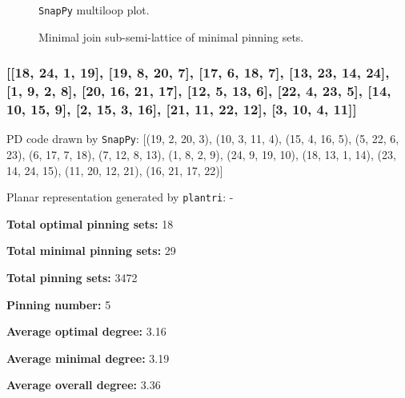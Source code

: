 \documentclass{article}%
\begin{document}
\begin{multicols}{2}
\begin{figure}[H]
\centering

\caption{\texttt{SnapPy} multiloop plot.}
\label{fig:tex/img/[[7, 14, 8, 1], [6, 24, 7, 15], [13, 17, 14, 18], [8, 17, 9, 16], [1, 16, 2, 15], [5, 19, 6, 20], [23, 18, 24, 19], [12, 22, 13, 23], [9, 3, 10, 2], [20, 10, 21, 11], [11, 4, 12, 5], [21, 3, 22, 4]].svg}
\end{figure}
\columnbreak

\begin{figure}[H]
\centering
\scalebox{0.8}{}
\caption{Minimal join sub-semi-lattice of minimal pinning sets.}
\label{fig:tex/img/[[7, 14, 8, 1], [6, 24, 7, 15], [13, 17, 14, 18], [8, 17, 9, 16], [1, 16, 2, 15], [5, 19, 6, 20], [23, 18, 24, 19], [12, 22, 13, 23], [9, 3, 10, 2], [20, 10, 21, 11], [11, 4, 12, 5], [21, 3, 22, 4]].pgf}
\end{figure}
\end{multicols}

\newpage

\subsubsection{[[18, 24, 1, 19], [19, 8, 20, 7], [17, 6, 18, 7], [13, 23, 14, 24], [1, 9, 2, 8], [20, 16, 21, 17], [12, 5, 13, 6], [22, 4, 23, 5], [14, 10, 15, 9], [2, 15, 3, 16], [21, 11, 22, 12], [3, 10, 4, 11]]}

{\small\noindent PD code drawn by \texttt{SnapPy}: [(19, 2, 20, 3), (10, 3, 11, 4), (15, 4, 16, 5), (5, 22, 6, 23), (6, 17, 7, 18), (7, 12, 8, 13), (1, 8, 2, 9), (24, 9, 19, 10), (18, 13, 1, 14), (23, 14, 24, 15), (11, 20, 12, 21), (16, 21, 17, 22)]}

{\small\noindent Planar representation generated by \texttt{plantri}: -}

\begin{multicols}{2}
{\normalsize \noindent\textbf{Total optimal pinning sets:} 18

\noindent\textbf{Total minimal pinning sets:} 29

\noindent\textbf{Total pinning sets:} 3472

\noindent\textbf{Pinning number:} 5

}
\columnbreak

{\normalsize \noindent\textbf{Average optimal degree:} 3.16

\noindent\textbf{Average minimal degree:} 3.19

\noindent\textbf{Average overall degree:} 3.36

}
\end{multicols}
\end{document}
